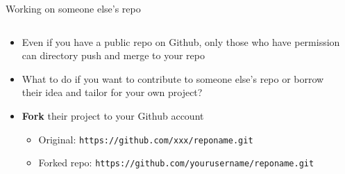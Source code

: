 \documentclass[handout,pdftex,10pt,aspectratio=169]{beamer}
\begin{document}
\begin{frame}{Working on someone else's repo}
  \begin{columns}[c]
    \begin{column}{0.55\linewidth}
      \begin{itemize}[<+->]\setlength\itemsep{10pt}
        \setlength{\leftmarginii}{10pt}
        \item Even if you have a public repo on Github, only those who have permission
        can directory push and merge to your repo
        \item What to do if you want to contribute to someone else's repo or borrow their idea and
        tailor for your own project?
        \item \textbf{Fork} their project to your Github account
        \begin{itemize}
          \item Original: \texttt{https://github.com/xxx/reponame.git}
          \item Forked repo: \texttt{https://github.com/yourusername/reponame.git}
        \end{itemize}
      \end{itemize}
        \end{column}\hfill
    \begin{column}{0.44\linewidth}
      \centering
      \end{column}
  \end{columns}
\end{frame}
\end{document}
